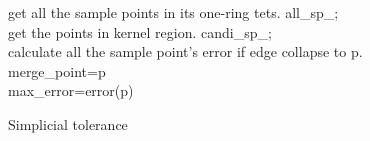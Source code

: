 \documentclass{article}
\theoremstyle{definition}
\theoremstyle{remark}
\begin{document}
  \begin{algorithm}[H]
     {
      get all the sample points in its one-ring tets. all\_sp\_;\\
      get the points in kernel region. candi\_sp\_;\\
       {
        calculate all the sample point's error if edge collapse to p.\\
         {
          merge\_point=p\\
          max\_error=error(p)
        }
      }
    }
   \caption{Simplicial tolerance}
\end{algorithm}
\end{document}
